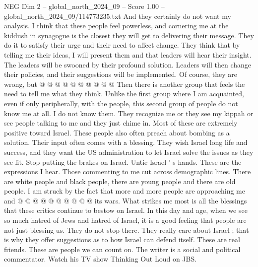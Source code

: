 \begin{textsample}{NEG Dim 2 – global\_north\_2024\_09 – Score 1.00 – global\_north\_2024\_09/114773235.txt}
And they certainly do not want my analysis.
I think that these people feel powerless, and cornering me at the kiddush in synagogue is the closest they will get to delivering their message.
They do it to satisfy their urge and their need to affect change.
They think that by telling me their ideas, I will present them and that leaders will hear their insight.
The leaders will be swooned by their profound solution.
Leaders will then change their policies, and their suggestions will be implemented.
Of course, they are wrong, but @ @ @ @ @ @ @ @ @ @ Then there is another group that feels the need to tell me what they think.
Unlike the first group where I am acquainted, even if only peripherally, with the people, this second group of people do not know me at all.
I do not know them.
They recognize me or they see my kippah or see people talking to me and they just chime in.
Most of these are extremely positive toward Israel.
These people also often preach about bombing as a solution.
Their input often comes with a blessing.
They wish Israel long life and success, and they want the US administration to let Israel solve the issues as they see fit.
Stop putting the brakes on Israel.
Untie Israel ' s hands.
These are the expressions I hear.
Those commenting to me cut across demographic lines.
There are white people and black people, there are young people and there are old people.
I am struck by the fact that more and more people are approaching me and @ @ @ @ @ @ @ @ @ @ its wars.
What strikes me most is all the blessings that these critics continue to bestow on Israel.
In this day and age, when we see so much hatred of Jews and hatred of Israel, it is a good feeling that people are not just blessing us.
They do not stop there.
They really care about Israel ; that is why they offer suggestions as to how Israel can defend itself.
These are real friends.
These are people we can count on.
The writer is a social and political commentator.
Watch his TV show Thinking Out Loud on JBS.

\end{textsample}
